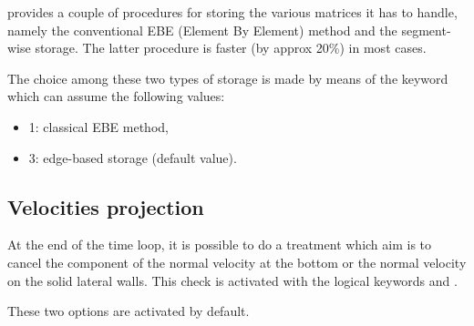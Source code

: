  provides a couple of procedures for storing the various matrices it
has to handle, namely the conventional EBE (Element By Element) method and the
segment-wise storage. The latter procedure is faster (by approx 20\%) in most
cases.

The choice among these two types of storage is made by means of the keyword
 which can assume the following values:

\begin{itemize}
\item 1: classical EBE method,

\item 3: edge-based storage (default value).
\end{itemize}

\subsection{Velocities projection}

At the end of the time loop, it is possible to do a treatment which aim is to
cancel the component of the normal velocity at the bottom or the normal
velocity on the solid lateral walls. This check is activated with the logical
keywords  and
.

These two options are activated by default.
